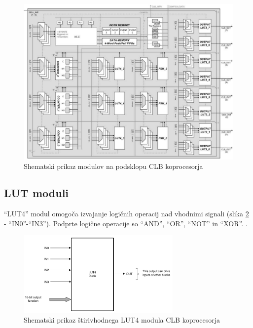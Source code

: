 \documentclass[a4paper]{article}
\begin{document}
\begin{sloppypar}
\begin{figure}[t]
    \begin{center}
        \begin{minipage}[t]{12cm}
            \includegraphics[width=12cm]{clb_moduli}
            \caption{Shematski prikaz modulov na podsklopu CLB koprocesorja
                     \cite[Pogl.~2.3.3]{fpga-to-clb}}
            \label{fig:clb_moduli}
        \end{minipage}
    \end{center}
\end{figure}

\subsection{LUT moduli}\label{sec:lut}
``LUT4'' modul omogoča izvajanje logičnih operacij nad vhodnimi signali (slika
\ref{fig:lut4} - ``IN0''-``IN3''). Podprte logične operacije so ``AND'',
``OR'', ``NOT'' in ``XOR''.  \cite[Pogl.~3.3]{clb-user-guide}. 

\begin{figure}[htb]
    \centerline{\includegraphics[width=8cm]{shema_lut}}
    \caption{Shematski prikaz štirivhodnega LUT4 modula CLB koprocesorja
             \cite[Pogl.~26.4.4]{mcu-ref-manual}}
    \label{fig:lut4} 
\end{figure} 


\end{sloppypar}
\end{document}
